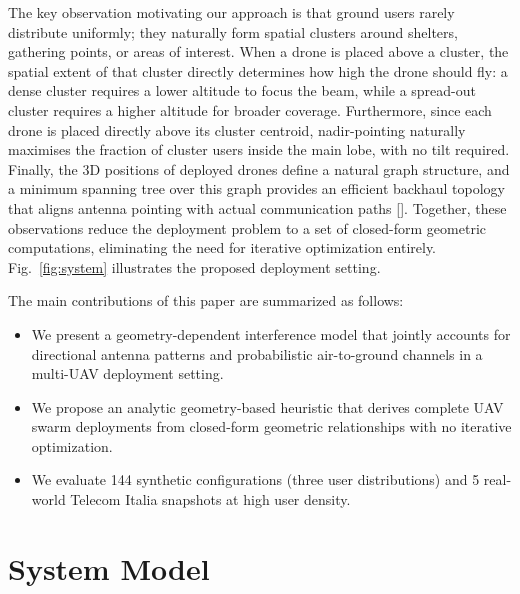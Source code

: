 \documentclass[conference]{IEEEtran}
\begin{document}
The key observation motivating our approach is that ground users rarely distribute uniformly; they naturally form spatial clusters around shelters, gathering points, or areas of interest. When a drone is placed above a cluster, the spatial extent of that cluster directly determines how high the drone should fly: a dense cluster requires a lower altitude to focus the beam, while a spread-out cluster requires a higher altitude for broader coverage. Furthermore, since each drone is placed directly above its cluster centroid, nadir-pointing naturally maximises the fraction of cluster users inside the main lobe, with no tilt required. Finally, the 3D positions of deployed drones define a natural graph structure, and a minimum spanning tree over this graph provides an efficient backhaul topology that aligns antenna pointing with actual communication paths []. Together, these observations reduce the deployment problem to a set of closed-form geometric computations, eliminating the need for iterative optimization entirely. Fig.~\ref{fig:system} illustrates the proposed deployment setting. 

The main contributions of this paper are summarized as follows:
\begin{itemize}
    \item We present a geometry-dependent interference model that jointly accounts for directional antenna patterns and probabilistic air-to-ground channels in a multi-UAV deployment setting.
    \item We propose an analytic geometry-based heuristic that derives complete UAV swarm deployments from closed-form geometric relationships with no iterative optimization.
    \item We evaluate 144 synthetic configurations (three user distributions) and 5 real-world Telecom Italia snapshots at high user density.
\end{itemize}



\section{System Model}
\label{sec:system}
\end{document}
